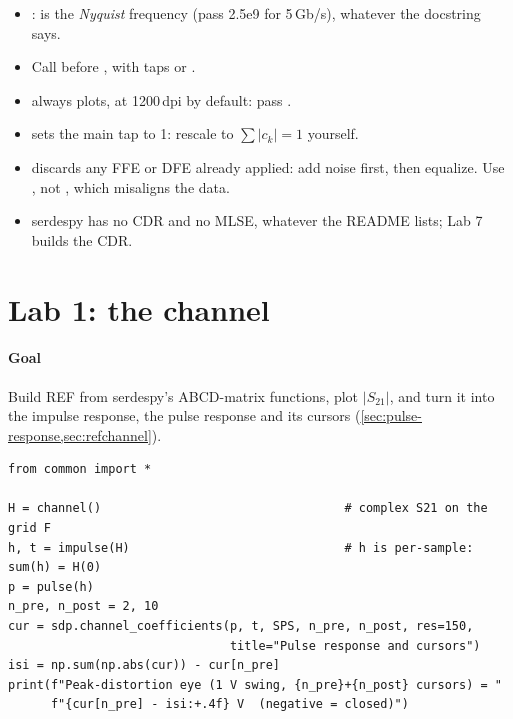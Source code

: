 \begin{pitfall}
\begin{itemize}
  \item {}:  is the \emph{Nyquist} frequency (pass 2.5e9 for 5\,Gb/s), whatever the docstring says.
  \item Call  before , with taps  or .
  \item {} always plots, at 1200\,dpi by default: pass .
  \item {} sets the main tap to 1: rescale to $\sum\lvert c_k\rvert=1$ yourself.
  \item {} discards any FFE or DFE already applied: add noise first, then equalize. Use , not , which misaligns the data.
  \item serdespy has no CDR and no MLSE, whatever the README lists; Lab 7 builds the CDR.
\end{itemize}
\end{pitfall}

\section{Lab 1: the channel}\label{sec:lab1}

\paragraph{Goal} Build REF from serdespy's ABCD-matrix functions, plot $\lvert S_{21}\rvert$, and turn it into the impulse response, the pulse response and its cursors (\cref{sec:pulse-response,sec:refchannel}).

\begin{lstlisting}
from common import *

H = channel()                                  # complex S21 on the grid F
h, t = impulse(H)                              # h is per-sample: sum(h) = H(0)
p = pulse(h)
n_pre, n_post = 2, 10
cur = sdp.channel_coefficients(p, t, SPS, n_pre, n_post, res=150,
                               title="Pulse response and cursors")
isi = np.sum(np.abs(cur)) - cur[n_pre]
print(f"Peak-distortion eye (1 V swing, {n_pre}+{n_post} cursors) = "
      f"{cur[n_pre] - isi:+.4f} V  (negative = closed)")
\end{lstlisting}

